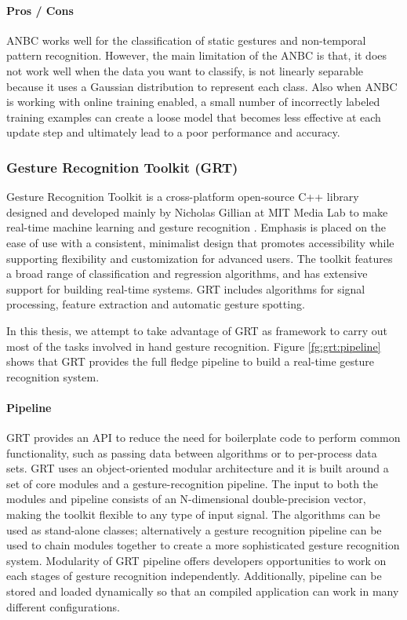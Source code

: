 \paragraph*{Pros / Cons} ANBC works well for the classification of static gestures and non-temporal pattern recognition. However, the main limitation of the ANBC is that, it does not work well when the data you want to classify, is not linearly separable because it uses a Gaussian distribution to represent each class. Also when ANBC is working with online training enabled, a small number of incorrectly labeled training examples can create a loose model that becomes less effective at each update step and ultimately lead to a poor performance and accuracy.

\subsubsection{Gesture Recognition Toolkit (GRT)} \label{sec:grt} Gesture Recognition Toolkit is a cross-platform open-source C++ library designed and developed mainly by Nicholas Gillian at MIT Media Lab to make real-time machine learning and gesture recognition \cite{16}. Emphasis is placed on the ease of use with a consistent, minimalist design that promotes accessibility while supporting flexibility and customization for advanced users. The toolkit features a broad range of classification and regression algorithms, and has extensive support for building real-time systems. GRT includes algorithms for signal processing, feature extraction and automatic gesture spotting. 

In this thesis, we attempt to take advantage of GRT as framework to carry out most of the tasks involved in hand gesture recognition. Figure \ref{fg:grt:pipeline} shows that GRT provides the full fledge pipeline to build a real-time gesture recognition system. 



\paragraph*{Pipeline} GRT provides an API to reduce the need for boilerplate code to perform common functionality, such as passing data between algorithms or to per-process data sets. GRT uses an object-oriented modular architecture and it is built around a set of core modules and a gesture-recognition pipeline. The input to both the modules and pipeline consists of an N-dimensional double-precision vector, making the toolkit flexible to any type of input signal. The algorithms can be used as stand-alone classes; alternatively a gesture recognition pipeline can be used to chain modules together to create a more sophisticated gesture recognition system. Modularity of GRT pipeline offers developers opportunities to work on each stages of gesture recognition independently. Additionally, pipeline can be stored and loaded dynamically so that an compiled application can work in many different configurations. 


